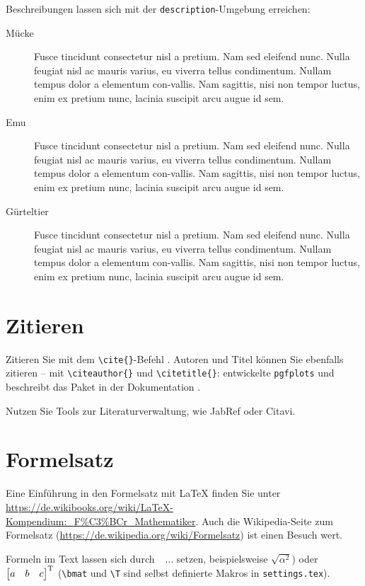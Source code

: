 Beschreibungen lassen sich mit der \texttt{description}-Umgebung erreichen:

\begin{description}
    \item[Mücke] Fusce tincidunt consectetur nisl a pretium. Nam sed eleifend nunc. Nulla feugiat nisl ac mauris varius, eu viverra tellus condimentum. Nullam tempus dolor a elementum con-vallis. Nam sagittis, nisi non tempor luctus, enim ex pretium nunc, lacinia suscipit arcu augue id sem.
    \item[Emu] Fusce tincidunt consectetur nisl a pretium. Nam sed eleifend nunc. Nulla feugiat nisl ac mauris varius, eu viverra tellus condimentum. Nullam tempus dolor a elementum con-vallis. Nam sagittis, nisi non tempor luctus, enim ex pretium nunc, lacinia suscipit arcu augue id sem.
    \item[Gürteltier] Fusce tincidunt consectetur nisl a pretium. Nam sed eleifend nunc. Nulla feugiat nisl ac mauris varius, eu viverra tellus condimentum. Nullam tempus dolor a elementum con-vallis. Nam sagittis, nisi non tempor luctus, enim ex pretium nunc, lacinia suscipit arcu augue id sem.
\end{description}

\section{Zitieren}

Zitieren Sie mit dem \texttt{\textbackslash cite\{\}}-Befehl \cite{Cochran2005,Cubitt2013}.
Autoren und Titel können Sie ebenfalls zitieren -- mit \texttt{\textbackslash citeauthor\{\}} und \texttt{\textbackslash citetitle\{\}}: \citeauthor{Feuersaenger2014} entwickelte \texttt{pgfplots} und beschreibt das Paket in der Dokumentation \textit{}.

Nutzen Sie Tools zur Literaturverwaltung, wie JabRef oder Citavi.

\section{Formelsatz}

Eine Einführung in den Formelsatz mit \LaTeX{} finden Sie unter \url{https://de.wikibooks.org/wiki/LaTeX-Kompendium:_F%C3%BCr_Mathematiker}.
Auch die Wikipedia-Seite zum Formelsatz (\url{https://de.wikipedia.org/wiki/Formelsatz}) ist einen Besuch wert.

Formeln im Text lassen sich durch \texttt{\ \(\ \ldots \)} setzen, beispielsweise \(\sqrt{\alpha^2}\)) oder \( \begin{bmatrix} a & b & c \end{bmatrix}^{\mathrm{T}} \) (\texttt{\textbackslash bmat} und \texttt{\textbackslash T} sind selbst definierte Makros in \texttt{settings.tex}).

